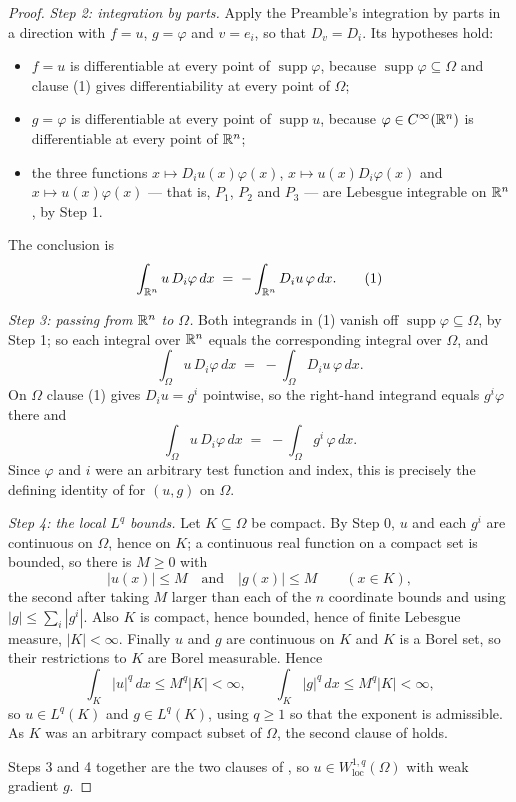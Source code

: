 \begin{proof}
\emph{Step 2: integration by parts.}  Apply the Preamble's integration by parts
in a direction with $f=u$, $g=\varphi$ and $v=e_i$, so that $D_v=D_i$.  Its
hypotheses hold:
\begin{itemize}
\item $f=u$ is differentiable at every point of $\operatorname{supp}\varphi$,
  because $\operatorname{supp}\varphi\subseteq\Omega$ and clause (1) gives
  differentiability at every point of $\Omega$;
\item $g=\varphi$ is differentiable at every point of $\operatorname{supp}u$,
  because $\varphi\in C^\infty(\mathbb{R}^n)$ is differentiable at every point of
  $\mathbb{R}^n$;
\item the three functions $x\mapsto D_iu(x)\varphi(x)$,
  $x\mapsto u(x)D_i\varphi(x)$ and $x\mapsto u(x)\varphi(x)$ --- that is,
  $P_1$, $P_2$ and $P_3$ --- are Lebesgue integrable on $\mathbb{R}^n$, by Step 1.
\end{itemize}
The conclusion is
\begin{equation}
\int_{\mathbb{R}^n}u\,D_i\varphi\,dx\;=\;-\int_{\mathbb{R}^n}D_iu\,\varphi\,dx .
\tag{1}
\end{equation}

\emph{Step 3: passing from $\mathbb{R}^n$ to $\Omega$.}  Both integrands in (1) vanish
off $\operatorname{supp}\varphi\subseteq\Omega$, by Step 1; so each integral
over $\mathbb{R}^n$ equals the corresponding integral over $\Omega$, and
\[
\int_\Omega u\,D_i\varphi\,dx\;=\;-\int_\Omega D_iu\,\varphi\,dx .
\]
On $\Omega$ clause (1) gives $D_iu=g^i$ pointwise, so the right-hand integrand
equals $g^i\varphi$ there and
\[
\int_\Omega u\,D_i\varphi\,dx\;=\;-\int_\Omega g^i\,\varphi\,dx .
\]
Since $\varphi$ and $i$ were an arbitrary test function and index, this is
precisely the defining identity of  for $(u,g)$ on
$\Omega$.

\emph{Step 4: the local $L^q$ bounds.}  Let $K\subseteq\Omega$ be compact.  By
Step 0, $u$ and each $g^i$ are continuous on $\Omega$, hence on $K$; a
continuous real function on a compact set is bounded, so there is $M\ge0$ with
\[
|u(x)|\le M\quad\text{and}\quad |g(x)|\le M\qquad(x\in K),
\]
the second after taking $M$ larger than each of the $n$ coordinate bounds and
using $|g|\le\sum_i|g^i|$.  Also $K$ is compact, hence bounded, hence of finite
Lebesgue measure, $|K|<\infty$.  Finally $u$ and $g$ are continuous on $K$ and
$K$ is a Borel set, so their restrictions to $K$ are Borel measurable.  Hence
\[
\int_K|u|^q\,dx\le M^q|K|<\infty,\qquad
\int_K|g|^q\,dx\le M^q|K|<\infty,
\]
so $u\in L^q(K)$ and $g\in L^q(K)$, using $q\ge1$ so that the exponent is
admissible.  As $K$ was an arbitrary compact subset of $\Omega$, the second
clause of  holds.

Steps 3 and 4 together are the two clauses of , so
$u\in W^{1,q}_{\mathrm{loc}}(\Omega)$ with weak gradient $g$.
\end{proof}
